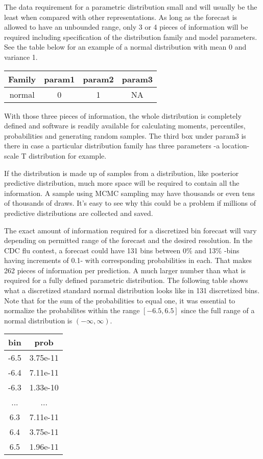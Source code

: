 \documentclass{article}\usepackage[]{graphicx}\usepackage[]{color}
\begin{document}
The data requirement for a parametric distribution small and will usually be the 
least when compared with other representations. As long as the forecast is 
allowed to have an unbounded range, only 3 or 4 pieces of information will be
required including specification of the distribution family and model 
parameters. See the table below for an example of a normal distribution with 
mean 0 and variance 1.

\begin{table}[h!]
\centering
 \begin{tabular}{||c c c c||} 
 \hline
 Family & param1 & param2 & param3 \\ [0.5ex] 
 \hline\hline
 normal & 0 & 1 & NA \\ 
 \hline
 \end{tabular}
\end{table}

With those three pieces of information, the whole distribution is completely
defined and software is readily available for calculating moments, percentiles,
probabilities and generating random samples. The third box under param3 is there
in case a particular distribution family has three parameters -a location-scale
T distribution for example.

If the distribution is made up of samples from a distribution, like posterior
predictive distribution, much more space will be required to contain all the 
information. A sample using MCMC sampling may have thousands or even tens of 
thousands of draws. It's easy to see why this could be a problem if millions of
predictive distributions are collected and saved.

The exact amount of information required for a discretized bin forecast will 
vary depending on permitted range of the forecast and the desired resolution. 
In the CDC flu contest, a forecast could have 131 bins between 0\% and 13\% 
-bins having increments of 0.1- with 
corresponding probabilities in each. That makes 262 pieces of information per
prediction. A much larger number than what is required for a fully defined
parametric distribution. The following table shows what a discretized standard
normal distribution looks like in 131 discretized bins. Note that for the sum of 
the probabilities to equal one, it was essential to normalize the probabilites
within the range $[-6.5,6.5]$ since the full range of a normal distribution is
$(-\infty, \infty)$.

\begin{table}[h!]
\centering
 \begin{tabular}{|c|c|} 
 \hline
    bin & prob \\ \hline
    -6.5 & 3.75e-11 \\
    -6.4 & 7.11e-11 \\
    -6.3 & 1.33e-10 \\
    ...  & ... \\
    6.3 & 7.11e-11 \\
    6.4 & 3.75e-11 \\
    6.5 & 1.96e-11 \\
 \hline
 \end{tabular}
\end{table}
\end{document}
